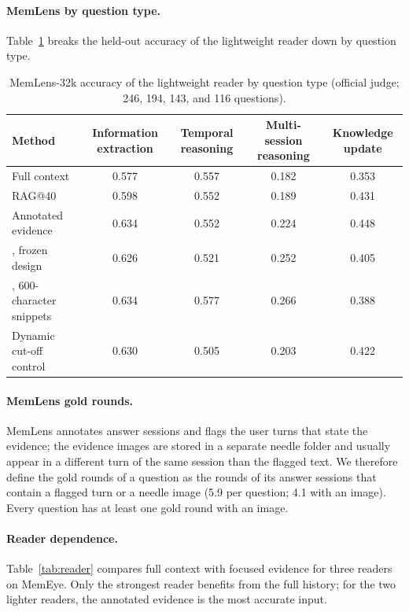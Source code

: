 \paragraph{MemLens by question type.} Table~\ref{tab:memlens_type} breaks the held-out accuracy of the lightweight reader down by question type.

\begin{table}[h]
\centering
\caption{MemLens-32k accuracy of the lightweight reader by question type (official judge; 246, 194, 143, and 116 questions).}
\label{tab:memlens_type}
\small
\begin{tabular}{lcccc}
\toprule
Method & Information extraction & Temporal reasoning & Multi-session reasoning & Knowledge update \\
\midrule
Full context & 0.577 & 0.557 & 0.182 & 0.353 \\
RAG@40 & 0.598 & 0.552 & 0.189 & 0.431 \\
Annotated evidence & 0.634 & 0.552 & 0.224 & 0.448 \\
\qss{}, frozen design & 0.626 & 0.521 & 0.252 & 0.405 \\
\qss{}, 600-character snippets & 0.634 & 0.577 & 0.266 & 0.388 \\
Dynamic cut-off control & 0.630 & 0.505 & 0.203 & 0.422 \\
\bottomrule
\end{tabular}
\end{table}

\paragraph{MemLens gold rounds.} MemLens annotates answer sessions and flags the user turns that state the evidence; the evidence images are stored in a separate needle folder and usually appear in a different turn of the same session than the flagged text. We therefore define the gold rounds of a question as the rounds of its answer sessions that contain a flagged turn or a needle image (5.9 per question; 4.1 with an image). Every question has at least one gold round with an image.

\paragraph{Reader dependence.} Table~\ref{tab:reader} compares full context with focused evidence for three readers on MemEye. Only the strongest reader benefits from the full history; for the two lighter readers, the annotated evidence is the most accurate input.

